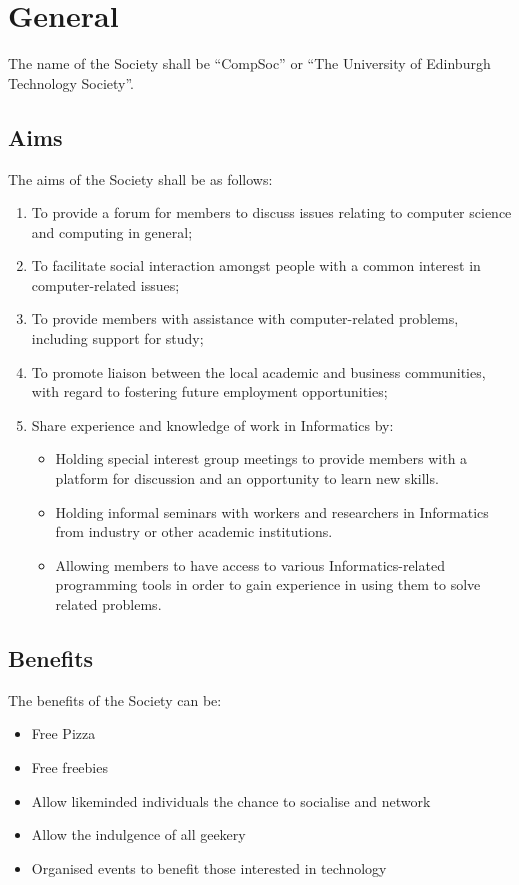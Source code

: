 \section{General}

The name of the Society shall be \enquote{CompSoc} or \enquote{The University of Edinburgh Technology Society}.

\subsection{Aims}

The aims of the Society shall be as follows:

\begin{enumerate}
  \item To provide a forum for members to discuss issues relating to computer science and computing in general;
  \item To facilitate social interaction amongst people with a common interest in computer-related issues;
  \item To provide members with assistance with computer-related problems, including support for study;
  \item To promote liaison between the local academic and business communities, with regard to fostering future employment opportunities;
  \item Share experience and knowledge of work in Informatics by:
    \begin{itemize}
        \item Holding special interest group meetings to provide members with a platform for discussion and an opportunity to learn new skills.
        \item Holding informal seminars with workers and researchers in Informatics from industry or other academic institutions.
        \item Allowing members to have access to various Informatics-related programming tools in order to gain experience in using them to solve related problems.
    \end{itemize}
\end{enumerate}


\subsection{Benefits}

The benefits of the Society can be:
  \begin{itemize}
  \item Free Pizza
  \item Free freebies
  \item Allow likeminded individuals the chance to socialise and network
  \item Allow the indulgence of all geekery
  \item Organised events to benefit those interested in technology
  \end{itemize}

